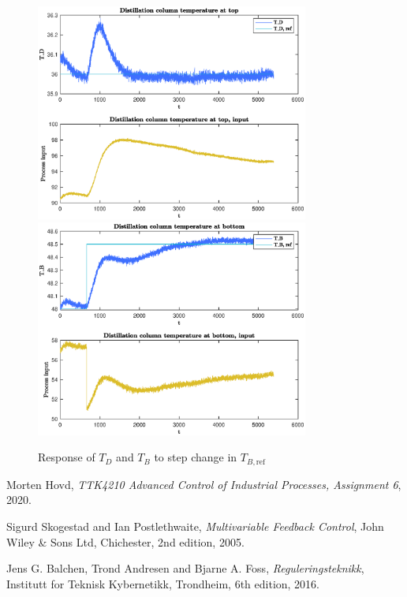 \documentclass[12pt]{article}
\begin{document}
\begin{figure}
\centering
\includegraphics[width=0.8\textwidth]{../Systemanalyse/Log_Data_to_Matlab/Figurer/LV_tuning/T_D_with_T_B_step.eps}
\includegraphics[width=0.8\textwidth]{../Systemanalyse/Log_Data_to_Matlab/Figurer/LV_tuning/T_B_with_T_B_step.eps}
\caption{Response of $T_D$ and $T_B $ to step change in $T_{B, \textrm{ref}}$}
\label{fig:T_B_step}
\end{figure}

\newpage
\begin{thebibliography}{9}

  Morten Hovd,
  \textit{TTK4210 Advanced Control of Industrial Processes, Assignment 6},
  2020.

  Sigurd Skogestad and Ian Postlethwaite,
  \textit{Multivariable Feedback Control},
  John Wiley \& Sons Ltd, Chichester,
  2nd edition,
  2005.
  
  Jens G. Balchen, Trond Andresen and Bjarne A. Foss,
  \textit{Reguleringsteknikk},
  Institutt for Teknisk Kybernetikk, Trondheim,
  6th edition,
  2016.

\end{thebibliography}
\end{document}
